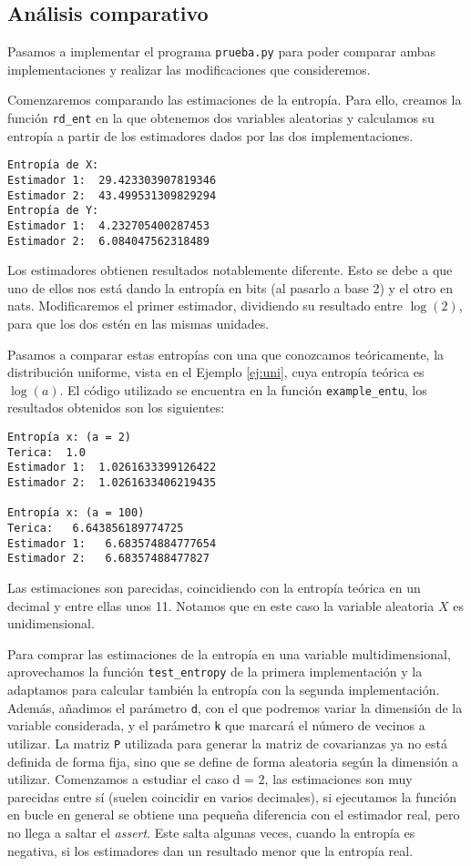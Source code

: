 \documentclass[10pt,a4paper]{article} %
\theoremstyle{definition}
\begin{document}
\subsection{Análisis comparativo}

Pasamos a implementar el programa \texttt{prueba.py} para poder comparar ambas implementaciones y realizar las modificaciones que consideremos.

Comenzaremos comparando las estimaciones de la entropía. Para ello, creamos la función \texttt{rd\_ent} en la que obtenemos dos variables aleatorias y calculamos su entropía a partir de los estimadores dados por las dos implementaciones.

\begin{lstlisting}
Entropía de X:
Estimador 1:  29.423303907819346
Estimador 2:  43.499531309829294
Entropía de Y:
Estimador 1:  4.232705400287453
Estimador 2:  6.084047562318489
\end{lstlisting}

Los estimadores obtienen resultados notablemente diferente. Esto se debe a que uno de ellos nos está dando la entropía en bits (al pasarlo a base 2) y el otro en nats. Modificaremos el primer estimador, dividiendo su resultado entre $\log(2)$, para que los dos estén en las mismas unidades.

Pasamos a comparar estas entropías con una que conozcamos teóricamente, la distribución uniforme, vista en el Ejemplo \ref{ej:uni}, cuya entropía teórica es $\log(a)$. El código utilizado se encuentra en la función \texttt{example\_entu}, los resultados obtenidos son los siguientes:

\begin{lstlisting}
Entropía x: (a = 2)
Terica:  1.0
Estimador 1:  1.0261633399126422
Estimador 2:  1.0261633406219435

Entropía x: (a = 100)
Terica:   6.643856189774725
Estimador 1:   6.683574884777654
Estimador 2:   6.68357488477827
\end{lstlisting}

Las estimaciones son parecidas, coincidiendo con la entropía teórica en un decimal y entre ellas unos 11. Notamos que en este caso la variable aleatoria $X$ es unidimensional.

Para comprar las estimaciones de la entropía en una variable multidimensional, aprovechamos la función \texttt{test\_entropy} de la primera implementación y la adaptamos para calcular también la entropía con la segunda implementación. Además, añadimos el parámetro \texttt{d}, con el que podremos variar la dimensión de la variable considerada, y el parámetro \texttt{k} que marcará el número de vecinos a utilizar. La matriz \texttt{P} utilizada para generar la matriz de covarianzas ya no está definida de forma fija, sino que se define de forma aleatoria según la dimensión a utilizar. Comenzamos a estudiar el caso d = 2, las estimaciones son muy parecidas entre sí (suelen coincidir en varios decimales), si ejecutamos la función en bucle  en general se obtiene una pequeña diferencia con el estimador real, pero no llega a saltar el \textit{assert}. Este salta algunas veces, cuando la entropía es negativa, si los estimadores dan un resultado menor que la entropía real.
\end{document}
